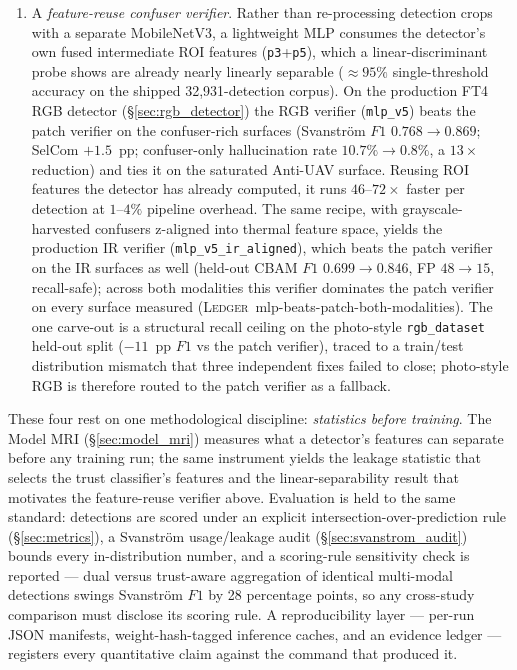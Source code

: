 \begin{enumerate}
    \item A \emph{feature-reuse confuser verifier}. Rather than re-processing detection crops with a separate MobileNetV3, a lightweight MLP consumes the detector's own fused intermediate ROI features (\texttt{p3}+\texttt{p5}), which a linear-discriminant probe shows are already nearly linearly separable ($\approx 95\%$ single-threshold accuracy on the shipped 32{,}931-detection corpus). On the production FT4 RGB detector (\S\ref{sec:rgb_detector}) the RGB verifier (\texttt{mlp\_v5}) beats the patch verifier on the confuser-rich surfaces (Svanstr\"om $F1$ $0.768\to0.869$; SelCom $+1.5$~pp; confuser-only hallucination rate $10.7\%\to0.8\%$, a $13\times$ reduction) and ties it on the saturated Anti-UAV surface. Reusing ROI features the detector has already computed, it runs $46$--$72\times$ faster per detection at $1$--$4\%$ pipeline overhead. The same recipe, with grayscale-harvested confusers z-aligned into thermal feature space, yields the production IR verifier (\texttt{mlp\_v5\_ir\_aligned}), which beats the patch verifier on the IR surfaces as well (held-out CBAM $F1$ $0.699\to0.846$, FP $48\to15$, recall-safe); across both modalities this verifier dominates the patch verifier on every surface measured (\textsc{Ledger}~mlp-beats-patch-both-modalities). The one carve-out is a structural recall ceiling on the photo-style \texttt{rgb\_dataset} held-out split ($-11$~pp $F1$ vs the patch verifier), traced to a train/test distribution mismatch that three independent fixes failed to close; photo-style RGB is therefore routed to the patch verifier as a fallback.
\end{enumerate}

These four rest on one methodological discipline: \emph{statistics before training}. The Model MRI (\S\ref{sec:model_mri}) measures what a detector's features can separate before any training run; the same instrument yields the leakage statistic that selects the trust classifier's features and the linear-separability result that motivates the feature-reuse verifier above. Evaluation is held to the same standard: detections are scored under an explicit intersection-over-prediction rule (\S\ref{sec:metrics}), a Svanstr\"om usage/leakage audit (\S\ref{sec:svanstrom_audit}) bounds every in-distribution number, and a scoring-rule sensitivity check is reported --- dual versus trust-aware aggregation of identical multi-modal detections swings Svanstr\"om $F1$ by 28 percentage points, so any cross-study comparison must disclose its scoring rule. A reproducibility layer --- per-run JSON manifests, weight-hash-tagged inference caches, and an evidence ledger --- registers every quantitative claim against the command that produced it.

